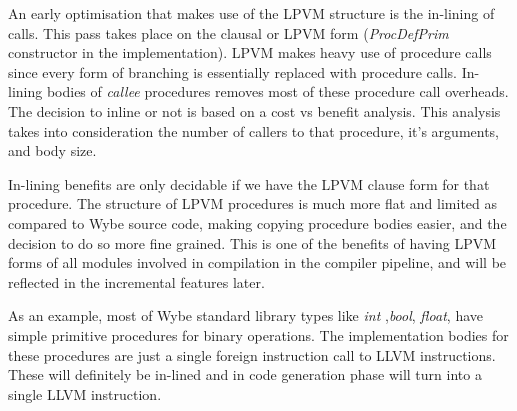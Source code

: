 An early optimisation that makes use of the LPVM structure is the in-lining of
calls. This pass takes place on the clausal or LPVM form (\textit{ProcDefPrim}
constructor in the implementation). LPVM makes heavy use of procedure calls
since every form of branching is essentially replaced with procedure
calls. In-lining bodies of \textit{callee} procedures removes most of these
procedure call overheads. The decision to inline or not is based on a cost vs
benefit analysis. This analysis takes into consideration the number of callers
to that procedure, it's arguments, and body size. 

In-lining benefits are only decidable if we have the LPVM clause form for that
procedure. The structure of LPVM procedures is much more flat and limited as
compared to Wybe source code, making copying procedure bodies easier, and the
decision to do so more fine grained. This is one of the benefits of having LPVM
forms of all modules involved in compilation in the compiler pipeline, and will
be reflected in the incremental features later.

As an example, most of Wybe standard library types like \textit{int}
,\textit{bool}, \textit{float}, have simple primitive procedures for binary
operations. The implementation bodies for these procedures are just a single
foreign instruction call to LLVM instructions. These will definitely be
in-lined and in code generation phase will turn into a single LLVM instruction.


